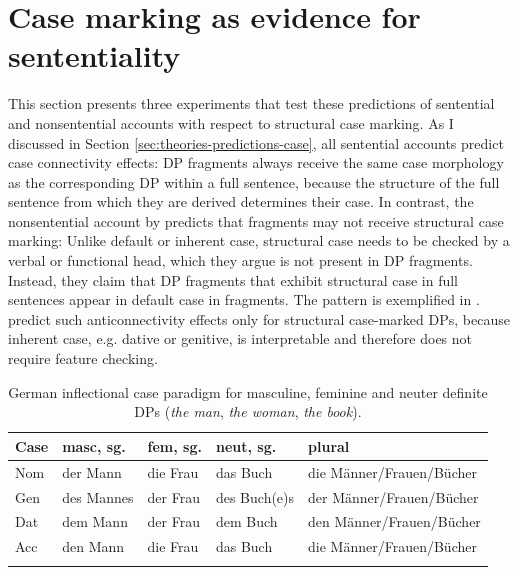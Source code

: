 \section{Case marking as evidence for sententiality}
\label{sec:experiments-case}

This section presents three experiments that test these predictions of sentential and nonsentential accounts with respect to structural case marking. As I discussed in Section \ref{sec:theories-predictions-case}, all sentential accounts predict case connectivity effects: DP fragments always receive the same case morphology as the corresponding DP within a full sentence, because the structure of the full sentence from which they are derived determines their case. In contrast, the nonsentential account by \citet{barton.progovac2005} predicts that fragments may not receive structural case marking: Unlike default or inherent case, structural case needs to be checked by a verbal or functional head, which they argue is not present in DP fragments. Instead, they claim that DP fragments that exhibit structural case in full sentences appear in default case in fragments. The pattern is exemplified in \Next. \citet{barton.progovac2005} predict such anticonnectivity effects only for structural case-marked DPs, because inherent case, e.g. dative or genitive, is interpretable and therefore does not require feature checking.\largerpage[-1]

\begin{table}
\begin{tabular}{l l l l l}
\lsptoprule
Case & masc, sg. & fem, sg. & neut, sg. & plural\\
\midrule
Nom & der Mann & die Frau & das Buch & die Männer/Frauen/Bücher\\
Gen & des Mannes & der Frau & des Buch(e)s & der Männer/Frauen/Bücher\\
Dat & dem Mann & der Frau & dem Buch & den Männer/Frauen/Bücher\\
Acc & den Mann & die Frau & das Buch &  die Männer/Frauen/Bücher\\
\lspbottomrule
\end{tabular}
\caption{German inflectional case paradigm for masculine, feminine and neuter definite DPs (\textit{the man}, \textit{the woman}, \textit{the book}).\label{tab:case-paradigm-german}}
\end{table}

